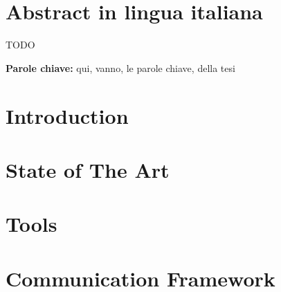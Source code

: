 \documentclass{Configuration_Files/PoliMi3i_thesis}
\begin{document}
\chapter*{Abstract in lingua italiana}
TODO



\textbf{Parole chiave:} qui, vanno, le parole chiave, della tesi %


\thispagestyle{empty}
\tableofcontents %
\thispagestyle{empty}
\cleardoublepage


\mainmatter %

\chapter{Introduction}
\label{ch:intro}


\chapter{State of The Art}
\label{ch:soa}



\chapter{Tools}
\label{ch:tools}


\chapter{Communication Framework}
\label{ch:communication}

\end{document}
